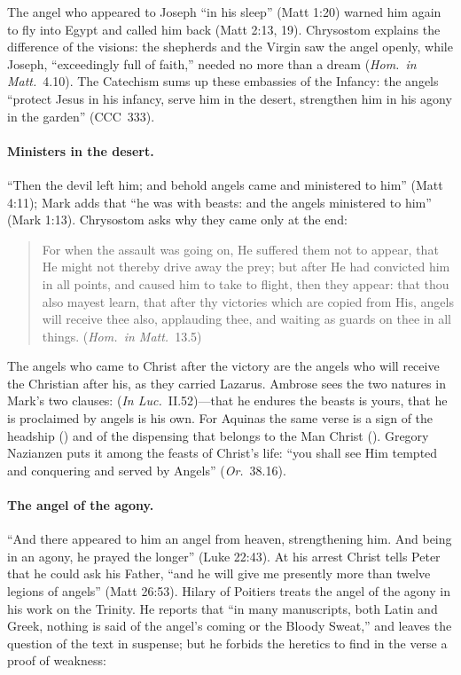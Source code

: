 The angel who appeared to Joseph ``in his sleep'' (Matt 1:20) warned him
again to fly into Egypt and called him back (Matt 2:13, 19). Chrysostom
explains the difference of the visions: the shepherds and the Virgin saw the
angel openly, while Joseph, ``exceedingly full of faith,'' needed no more
than a dream (\emph{Hom.\ in Matt.}\ 4.10). The Catechism sums up these
embassies of the Infancy: the angels ``protect Jesus in his infancy, serve
him in the desert, strengthen him in his agony in the garden'' (CCC~333).

\paragraph{Ministers in the desert.} ``Then the devil left him; and behold
angels came and ministered to him'' (Matt 4:11); Mark adds that ``he was
with beasts: and the angels ministered to him'' (Mark 1:13). Chrysostom
asks why they came only at the end:

\begin{quote}
For when the assault was going on, He suffered them not to appear, that He
might not thereby drive away the prey; but after He had convicted him in
all points, and caused him to take to flight, then they appear: that thou
also mayest learn, that after thy victories which are copied from His,
angels will receive thee also, applauding thee, and waiting as guards on
thee in all things. (\emph{Hom.\ in Matt.}\ 13.5)
\end{quote}

\noindent The angels who came to Christ after the victory are the angels
who will receive the Christian after his, as they carried Lazarus. Ambrose
sees the two natures in Mark's two clauses:  (\emph{In Luc.}\ II.52)---that he
endures the beasts is yours, that he is proclaimed by angels is his own. For
Aquinas the same verse is a sign of the headship () and of
the dispensing that belongs to the Man Christ ().
Gregory Nazianzen puts it among the feasts of Christ's life: ``you shall see
Him tempted and conquering and served by Angels'' (\emph{Or.}\ 38.16).

\paragraph{The angel of the agony.} ``And there appeared to him an angel
from heaven, strengthening him. And being in an agony, he prayed the
longer'' (Luke 22:43). At his arrest Christ tells Peter that he could ask
his Father, ``and he will give me presently more than twelve legions of
angels'' (Matt 26:53). Hilary of Poitiers treats the angel of the agony in
his work on the Trinity. He reports that ``in many manuscripts, both Latin
and Greek, nothing is said of the angel's coming or the Bloody Sweat,'' and
leaves the question of the text in suspense; but he forbids the heretics to
find in the verse a proof of weakness:

